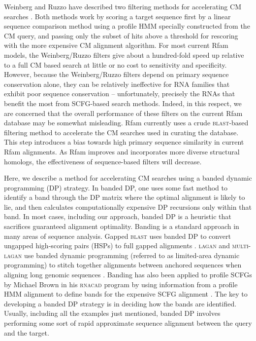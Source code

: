 \documentclass[11pt]{article}
\begin{document}
Weinberg and Ruzzo have described two filtering methods for
accelerating CM searches
\cite{WeinbergRuzzo04,WeinbergRuzzo04b,WeinbergRuzzo06}. Both methods work by scoring
a target sequence first by a linear sequence comparison method using a
profile HMM specially constructed from the CM query, and passing only
the subset of hits above a threshold for rescoring with the more
expensive CM alignment algorithm.  For most current Rfam models, the
Weinberg/Ruzzo filters give about a hundred-fold speed up relative to
a full CM based search at little or no cost to sensitivity and
specificity. However, because the Weinberg/Ruzzo filters depend on
primary sequence conservation alone, they can be relatively
ineffective for RNA families that exhibit poor sequence
conservation -- unfortunately, precisely the RNAs that benefit the
most from SCFG-based search methods.
Indeed, in this respect, we are concerned that the overall
performance of these filters on the current Rfam database may be somewhat
misleading. Rfam currently uses a crude \textsc{blast}-based filtering method
to accelerate the CM searches used in curating the database. This step
introduces a bias towards high primary sequence similarity in current
Rfam alignments. As Rfam improves and incorporates more diverse
structural homologs, the effectiveness of sequence-based filters will
decrease.

Here, we describe a method for accelerating CM searches using a banded
dynamic programming (DP) strategy. In banded DP, one uses some fast
method to identify a band through the DP matrix where the optimal
alignment is likely to lie, and then calculates computationally
expensive DP recursions only within that band. In most cases,
including our approach, banded DP is a heuristic that sacrifices
guaranteed alignment optimality. Banding is a standard approach in
many areas of sequence analysis. Gapped \textsc{blast} uses banded DP
to convert ungapped high-scoring pairs (HSPs) to full gapped
alignments \cite{Altschul97}.  \textsc{lagan} and \textsc{multi-lagan}
use banded dynamic programming (referred to as limited-area dynamic
programming) to stitch together alignments between anchored sequences
when aligning long genomic sequences \cite{Brudno03}. Banding has also been
applied to profile SCFGs by Michael Brown in his \textsc{rnacad}
program by using information from a profile HMM alignment to define
bands for the expensive SCFG alignment \cite{Brown00}. The key to
developing a banded DP strategy is in deciding how the bands are
identified.  Usually, including all the examples just mentioned,
banded DP involves performing some sort of rapid approximate sequence
alignment between the query and the target.
\end{document}
